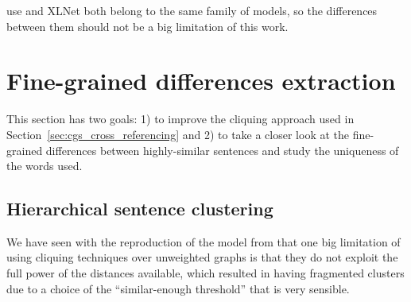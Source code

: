\acrshort{use} and XLNet both belong to the same family of models, so the differences between them should not be a big limitation of this work.




\section{\statusgreen Fine-grained differences extraction}
\label{sec:cgs_clustering_and_differences}

This section has two goals: 1) to improve the cliquing approach used in Section~\ref{sec:cgs_cross_referencing} and 2) to take a closer look at the fine-grained differences between highly-similar sentences and study the uniqueness of the words used.


\subsection{\statusorange Hierarchical sentence clustering}
\label{sec:cgs_clustering_and_differences_hierarchical}


We have seen with the reproduction of the model from \citet{bountouridis2018explaining} that one big limitation of using cliquing techniques over unweighted graphs is that they do not exploit the full power of the distances available, which resulted in having fragmented clusters due to a choice of the ``similar-enough threshold'' that is very sensible.

